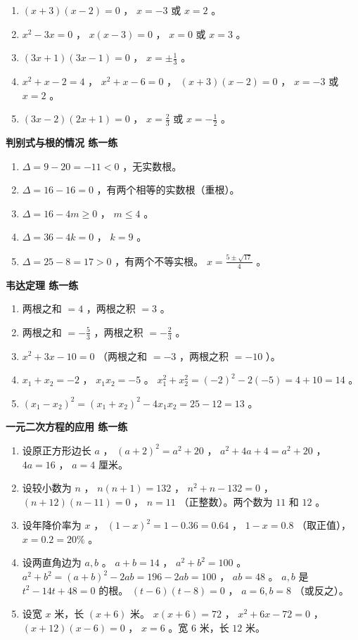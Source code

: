 \begin{answer}
\begin{enumerate}
  \item $(x + 3)(x - 2) = 0$ ， $x = -3$ 或 $x = 2$ 。
  \item $x^2 - 3x = 0$ ， $x(x - 3) = 0$ ， $x = 0$ 或 $x = 3$ 。
  \item $(3x + 1)(3x - 1) = 0$ ， $x = \pm\frac{1}{3}$ 。
  \item $x^2 + x - 2 = 4$ ， $x^2 + x - 6 = 0$ ， $(x + 3)(x - 2) = 0$ ， $x = -3$ 或 $x = 2$ 。
  \item $(3x - 2)(2x + 1) = 0$ ， $x = \frac{2}{3}$ 或 $x = -\frac{1}{2}$ 。
\end{enumerate}


\textbf{判别式与根的情况 练一练}

\begin{enumerate}
  \item $\Delta = 9 - 20 = -11 < 0$ ，无实数根。
  \item $\Delta = 16 - 16 = 0$ ，有两个相等的实数根（重根）。
  \item $\Delta = 16 - 4m \geq 0$ ， $m \leq 4$ 。
  \item $\Delta = 36 - 4k = 0$ ， $k = 9$ 。
  \item $\Delta = 25 - 8 = 17 > 0$ ，有两个不等实根。 $x = \frac{5 \pm \sqrt{17}}{4}$ 。
\end{enumerate}


\textbf{韦达定理 练一练}

\begin{enumerate}
  \item 两根之和 $= 4$ ，两根之积 $= 3$ 。
  \item 两根之和 $= -\frac{5}{3}$ ，两根之积 $= -\frac{2}{3}$ 。
  \item $x^2 + 3x - 10 = 0$ （两根之和 $= -3$ ，两根之积 $= -10$ ）。
  \item $x_1 + x_2 = -2$ ， $x_1 x_2 = -5$ 。 $x_1^2 + x_2^2 = (-2)^2 - 2(-5) = 4 + 10 = 14$ 。
  \item $(x_1 - x_2)^2 = (x_1 + x_2)^2 - 4x_1 x_2 = 25 - 12 = 13$ 。
\end{enumerate}


\textbf{一元二次方程的应用 练一练}

\begin{enumerate}
  \item 设原正方形边长 $a$ ， $(a + 2)^2 = a^2 + 20$ ， $a^2 + 4a + 4 = a^2 + 20$ ， $4a = 16$ ， $a = 4$ 厘米。
  \item 设较小数为 $n$ ， $n(n + 1) = 132$ ， $n^2 + n - 132 = 0$ ， $(n + 12)(n - 11) = 0$ ， $n = 11$ （正整数）。两个数为 $11$ 和 $12$ 。
  \item 设年降价率为 $x$ ， $(1 - x)^2 = 1 - 0.36 = 0.64$ ， $1 - x = 0.8$ （取正值）， $x = 0.2 = 20\%$ 。
  \item 设两直角边为 $a, b$ 。 $a + b = 14$ ， $a^2 + b^2 = 100$ 。 $a^2 + b^2 = (a+b)^2 - 2ab = 196 - 2ab = 100$ ， $ab = 48$ 。 $a, b$ 是 $t^2 - 14t + 48 = 0$ 的根。 $(t - 6)(t - 8) = 0$ ， $a = 6, b = 8$ （或反之）。
  \item 设宽 $x$ 米，长 $(x + 6)$ 米。 $x(x + 6) = 72$ ， $x^2 + 6x - 72 = 0$ ， $(x + 12)(x - 6) = 0$ ， $x = 6$ 。宽 $6$ 米，长 $12$ 米。
\end{enumerate}


\end{answer}
